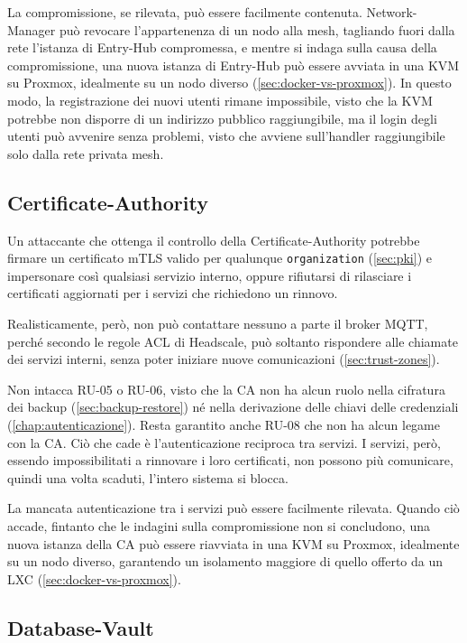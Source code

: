 La compromissione, se rilevata, può essere facilmente contenuta. Network-Manager può revocare
l'appartenenza di un nodo alla mesh, tagliando fuori dalla rete l'istanza di Entry-Hub compromessa, e mentre 
si indaga sulla causa della compromissione, una nuova istanza di Entry-Hub può essere avviata in una KVM su 
Proxmox, idealmente su un nodo diverso (\autoref{sec:docker-vs-proxmox}). In questo modo, la registrazione dei nuovi utenti rimane impossibile, visto che la KVM potrebbe
non disporre di un indirizzo pubblico raggiungibile, ma il login degli utenti può avvenire senza problemi, 
visto che avviene sull'handler raggiungibile solo dalla rete privata mesh.


\subsection{Certificate-Authority}

Un attaccante che ottenga il controllo della Certificate-Authority potrebbe firmare un certificato mTLS
valido per qualunque \texttt{organization} (\autoref{sec:pki}) e impersonare così qualsiasi servizio
interno, oppure rifiutarsi di rilasciare i certificati aggiornati per i servizi che richiedono un rinnovo.

Realisticamente, però, non può contattare nessuno a parte il broker MQTT, perché secondo le regole ACL di Headscale, può soltanto
rispondere alle chiamate dei servizi interni, senza poter iniziare nuove comunicazioni (\autoref{sec:trust-zones}).

Non intacca RU-05 o RU-06, visto che la CA non ha alcun ruolo nella cifratura dei backup
(\autoref{sec:backup-restore}) né nella derivazione delle chiavi delle credenziali
(\autoref{chap:autenticazione}).
Resta garantito anche RU-08 che non ha alcun legame con la CA.
Ciò che cade è l'autenticazione reciproca tra servizi.
I servizi, però, essendo impossibilitati a rinnovare i loro certificati, non possono più comunicare, quindi 
una volta scaduti, l'intero sistema si blocca.

La mancata autenticazione tra i servizi può essere facilmente rilevata. 
Quando ciò accade, fintanto che le indagini sulla compromissione non si concludono, una nuova istanza della 
CA può essere riavviata in una KVM su Proxmox, idealmente su 
un nodo diverso, garantendo un isolamento maggiore di quello offerto da un LXC (\autoref{sec:docker-vs-proxmox}).


\subsection{Database-Vault}

